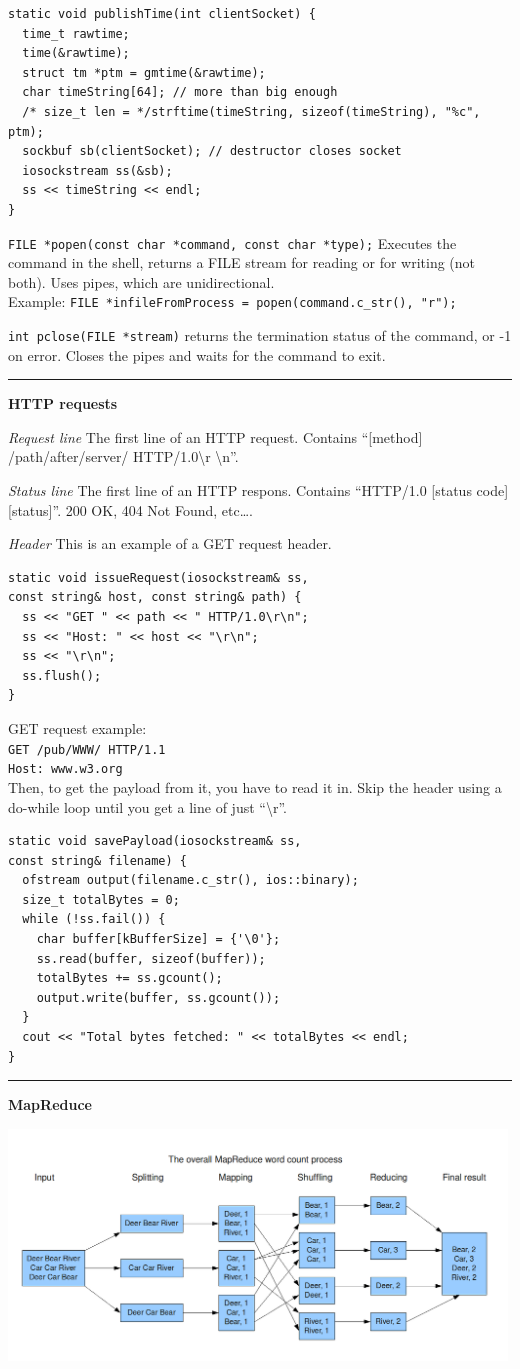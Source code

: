 \documentclass{article}
\begin{document}
\begin{multicols}{2}
{\begin{verbatim}
static void publishTime(int clientSocket) {
  time_t rawtime;
  time(&rawtime);
  struct tm *ptm = gmtime(&rawtime);
  char timeString[64]; // more than big enough
  /* size_t len = */strftime(timeString, sizeof(timeString), "%c", ptm);
  sockbuf sb(clientSocket); // destructor closes socket
  iosockstream ss(&sb);
  ss << timeString << endl;
}
  \end{verbatim} }
  {\tt FILE *popen(const char *command, const char *type);} Executes the command
  in the shell, returns a FILE stream for reading or for writing (not both).
  Uses pipes, which are unidirectional.\\
  Example: {\tt FILE *infileFromProcess = popen(command.c\_str(), "r");}

  {\tt int pclose(FILE *stream)} returns the termination status of the command,
  or -1 on error. Closes the pipes and waits for the command to exit.

  \noindent\rule{4cm}{0.4pt}

  {\bf HTTP requests}

  {\it Request line} The first line of an HTTP request. Contains ``[method]
  /path/after/server/ HTTP/1.0\textbackslash r \textbackslash n''.

  {\it Status line} The first line of an HTTP respons. Contains ``HTTP/1.0
  [status code] [status]''. 200 OK, 404 Not Found, etc\dots.

  {\it Header}
  This is an example of a GET request header.
  \begin{verbatim}
static void issueRequest(iosockstream& ss,
const string& host, const string& path) {
  ss << "GET " << path << " HTTP/1.0\r\n";
  ss << "Host: " << host << "\r\n";
  ss << "\r\n";
  ss.flush();
}  \end{verbatim}
  GET request example:\\
  {\tt GET /pub/WWW/ HTTP/1.1\\
  Host: www.w3.org}\\
  Then, to get the payload from it, you have to read it in. Skip the header
  using a do-while loop until you get a line of just ``\textbackslash r''.
  \begin{verbatim}
static void savePayload(iosockstream& ss,
const string& filename) {
  ofstream output(filename.c_str(), ios::binary);
  size_t totalBytes = 0;
  while (!ss.fail()) {
    char buffer[kBufferSize] = {'\0'};
    ss.read(buffer, sizeof(buffer));
    totalBytes += ss.gcount();
    output.write(buffer, ss.gcount());
  }
  cout << "Total bytes fetched: " << totalBytes << endl;
}
  \end{verbatim}

  \noindent\rule{4cm}{0.4pt}

  {\bf MapReduce}
\end{multicols}
  \includegraphics[width=500px]{mr.png}
\end{document}
